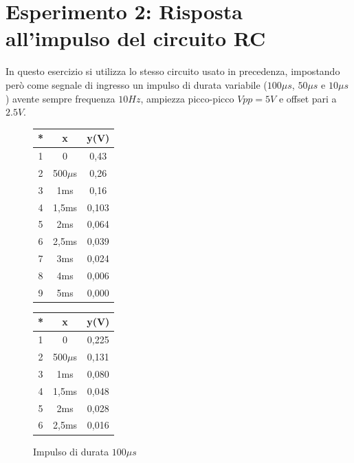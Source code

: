 \section{Esperimento 2: Risposta all’impulso del circuito RC}
In questo esercizio si utilizza lo stesso circuito usato in precedenza, impostando però come segnale di ingresso un impulso di durata variabile ($100 \mu s$, $50 \mu s$ e $10 \mu s$) avente sempre frequenza $10Hz$, ampiezza picco-picco $Vpp = 5V$ e offset pari a $2.5V$.
\begin{figure}[ht]
    \begin{minipage}{0.33\textwidth}
    \vspace{0pt}
        \centering
        \begin{tabular}{c|c|c}
            * & x & y(V) \\
            \hline
            1 & 0 & 0,43 \\
            \hline
            2 & 500$\mu$s & 0,26 \\
            \hline
            3 & 1ms & 0,16 \\
            \hline
            4 & 1,5ms & 0,103 \\
            \hline
            5 & 2ms & 0,064 \\
            \hline
            6 & 2,5ms & 0,039 \\
            \hline
            7 & 3ms & 0,024 \\
            \hline
            8 & 4ms & 0,006 \\
            \hline
            9 & 5ms & 0,000 \\
        \end{tabular}
        \caption{Impulso di durata $100\mu s$}
    \end{minipage}%
    \begin{minipage}{0.33\textwidth}
        \centering
        \begin{tabular}{c|c|c}
            * & x & y(V) \\
            \hline
            1 & 0 & 0,225 \\
            \hline
            2 & 500$\mu$s & 0,131 \\
            \hline
            3 & 1ms & 0,080 \\
            \hline
            4 & 1,5ms & 0,048 \\
            \hline
            5 & 2ms & 0,028 \\
            \hline
            6 & 2,5ms & 0,016 \\

\end{tabular}
\end{minipage}
\end{figure}
